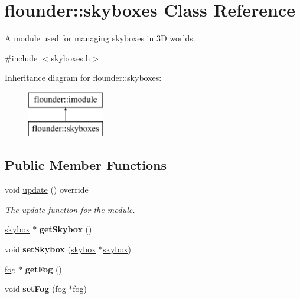 \hypertarget{classflounder_1_1skyboxes}{}\section{flounder\+:\+:skyboxes Class Reference}
\label{classflounder_1_1skyboxes}


A module used for managing skyboxes in 3D worlds.  




{\ttfamily \#include $<$skyboxes.\+h$>$}

Inheritance diagram for flounder\+:\+:skyboxes\+:\begin{figure}[H]
\begin{center}
\leavevmode
\includegraphics[height=2.000000cm]{classflounder_1_1skyboxes}
\end{center}
\end{figure}
\subsection*{Public Member Functions}
\begin{DoxyCompactItemize}
\item 
void \hyperlink{classflounder_1_1skyboxes_ae94e675bcda78f2af0298a8551b82aa6}{update} () override
\begin{DoxyCompactList}\small\item\em The update function for the module. \end{DoxyCompactList}\item 
\mbox{\label{classflounder_1_1skyboxes_a9bed77f9abdfc2eaf6b83db9db111bc6}} 
\hyperlink{classflounder_1_1skybox}{skybox} $\ast$ {\bfseries get\+Skybox} ()
\item 
\mbox{\label{classflounder_1_1skyboxes_a4dcbaebbb014415e10d547313c03ac46}} 
void {\bfseries set\+Skybox} (\hyperlink{classflounder_1_1skybox}{skybox} $\ast$\hyperlink{classflounder_1_1skybox}{skybox})
\item 
\mbox{\label{classflounder_1_1skyboxes_a7792767f3e4ba57d15c8ef4849e67f1b}} 
\hyperlink{classflounder_1_1fog}{fog} $\ast$ {\bfseries get\+Fog} ()
\item 
\mbox{\label{classflounder_1_1skyboxes_a63e345f07ea2429202b0978401610c15}} 
void {\bfseries set\+Fog} (\hyperlink{classflounder_1_1fog}{fog} $\ast$\hyperlink{classflounder_1_1fog}{fog})
\end{DoxyCompactItemize}
